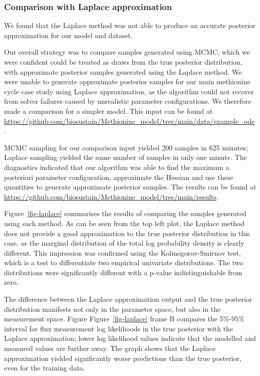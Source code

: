 \documentclass[journal=asbcd6,manuscript=article,layout=traditional]{achemso}
\begin{document}
\hypertarget{sec-laplace}{%
\subsubsection{Comparison with Laplace
approximation}\label{sec-laplace}}

We found that the Laplace method was not able to produce an accurate
posterior approximation for our model and dataset.

Our overall strategy was to compare samples generated using MCMC, which
we were confident could be treated as draws from the true posterior
distribution, with approximate posterior samples generated using the
Laplace method. We were unable to generate approximate posterior samples
for our main methionine cycle case study using Laplace approximation, as
the algorithm could not recover from solver failures caused by
unrealistic parameter configurations. We therefore made a comparison for
a simpler model. This input can be found at
\url{https://github.com/biosustain/Methionine_model/tree/main/data/example_ode}.

MCMC sampling for our comparison input yielded 200 samples in 625
minutes; Laplace sampling yielded the same number of samples in only one
minute. The diagnostics indicated that our algorithm was able to find
the maximum a posteriori parameter configuration, approximate the
Hessian and use these quantities to generate approximate posterior
samples. The results can be found at
\url{https://github.com/biosustain/Methionine_model/tree/main/results}.

Figure~\ref{fig-laplace} summarises the results of comparing the samples
generated using each method. As can be seen from the top left plot, the
Laplace method does not provide a good approximation to the true
posterior distribution in this case, as the marginal distribution of the
total log probability density is clearly different. This impression was
confirmed using the Kolmogorov-Smirnov test, which is a test to
differentiate two empirical univariate distributions. The two
distributions were significantly different with a p-value
indistinguishable from zero.

The difference between the Laplace approximation output and the true
posterior distribution manifests not only in the parameter space, but
also in the measurement space. Figure Figure~\ref{fig-laplace} frame B
compares the 5\%-95\% interval for flux measurement log likelihoods in
the true posterior with the Laplace approximation; lower log likelihood
values indicate that the modelled and measured values are further away.
The graph shows that the Laplace approximation yielded significantly
worse predictions than the true posterior, even for the training data.
\end{document}
